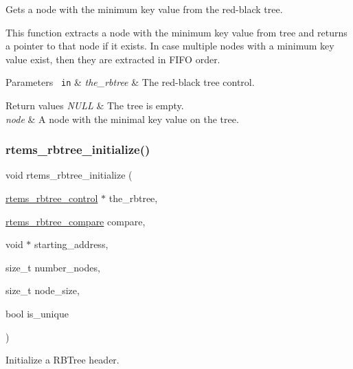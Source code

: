 Gets a node with the minimum key value from the red-\/black tree. 

This function extracts a node with the minimum key value from tree and returns a pointer to that node if it exists. In case multiple nodes with a minimum key value exist, then they are extracted in F\+I\+FO order.


\begin{DoxyParams}[1]{Parameters}
\mbox{\texttt{ in}}  & {\em the\+\_\+rbtree} & The red-\/black tree control.\\
\hline
\end{DoxyParams}

\begin{DoxyRetVals}{Return values}
{\em N\+U\+LL} & The tree is empty. \\
\hline
{\em node} & A node with the minimal key value on the tree. \\
\hline
\end{DoxyRetVals}
\mbox{\label{group__ClassicRBTrees_gaa246868bc29eb945e72a11be3fc98f14}} 
\subsubsection{\texorpdfstring{rtems\_rbtree\_initialize()}{rtems\_rbtree\_initialize()}}
{\footnotesize\ttfamily void rtems\+\_\+rbtree\+\_\+initialize (\begin{DoxyParamCaption}\item[{\mbox{\hyperlink{group__ClassicRBTrees_ga21fe446d0b3cb8b25c814e93357753ef}{rtems\+\_\+rbtree\+\_\+control}} $\ast$}]{the\+\_\+rbtree,  }\item[{\mbox{\hyperlink{group__ClassicRBTrees_gae5f1cdaef7551cbee5a877e65f442b93}{rtems\+\_\+rbtree\+\_\+compare}}}]{compare,  }\item[{void $\ast$}]{starting\+\_\+address,  }\item[{size\+\_\+t}]{number\+\_\+nodes,  }\item[{size\+\_\+t}]{node\+\_\+size,  }\item[{bool}]{is\+\_\+unique }\end{DoxyParamCaption})}



Initialize a R\+B\+Tree header. 

